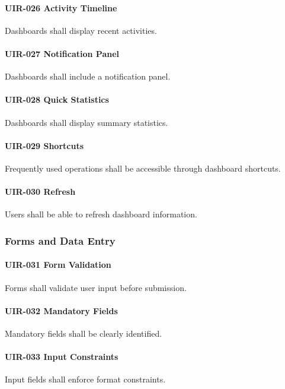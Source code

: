 \paragraph{UIR-026 Activity Timeline}
Dashboards shall display recent activities.

\paragraph{UIR-027 Notification Panel}
Dashboards shall include a notification panel.

\paragraph{UIR-028 Quick Statistics}
Dashboards shall display summary statistics.

\paragraph{UIR-029 Shortcuts}
Frequently used operations shall be accessible through dashboard
shortcuts.

\paragraph{UIR-030 Refresh}
Users shall be able to refresh dashboard information.


\subsubsection*{Forms and Data Entry}

\paragraph{UIR-031 Form Validation}
Forms shall validate user input before submission.

\paragraph{UIR-032 Mandatory Fields}
Mandatory fields shall be clearly identified.

\paragraph{UIR-033 Input Constraints}
Input fields shall enforce format constraints.

